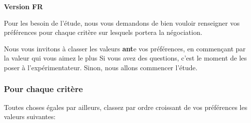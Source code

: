 \documentclass [french]{paper}
\begin{document}
				\textbf{Version FR}
				
					
					Pour les besoin de l'étude, nous vous demandons de bien vouloir renseigner vos préférences pour chaque critère sur lesquels portera la négociation.
				
					Nous vous invitons à classer les valeurs \textbf{ant}e vos préférences, en commençant par la valeur qui vous aimez le plus 	Si vous avez des questions, c'est le moment de les poser à l'expérimentateur. Sinon, nous allons commencer l'étude.
				

			
					
					\subsubsection{Pour chaque critère}
					Toutes choses égales par ailleurs, classez par ordre croissant de vos préférences les valeurs suivantes: 
\end{document}
